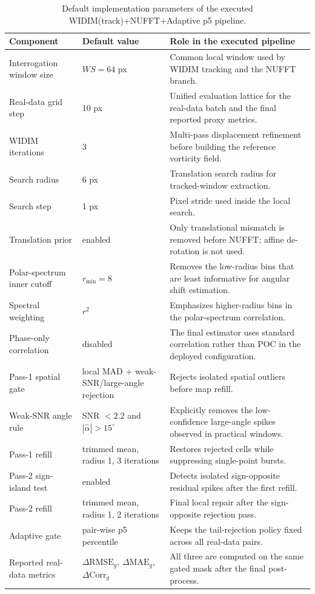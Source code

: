\documentclass[lettersize,journal,onecolumn]{IEEEtran}
\begin{document}
\begin{table}[!t]
  \centering
  \caption{Default implementation parameters of the executed WIDIM(track)+NUFFT+Adaptive p5 pipeline.}
  \label{tab:app_params}
  \small
  \renewcommand{\arraystretch}{1.12}
  \setlength{\tabcolsep}{4pt}
  \begin{tabular}{@{}p{3.3cm}p{2.1cm}p{7.6cm}@{}}
    \toprule
    Component & Default value & Role in the executed pipeline \\
    \midrule
    Interrogation window size & $WS=64$ px & Common local window used by WIDIM tracking and the NUFFT branch. \\
    Real-data grid step & 10 px & Unified evaluation lattice for the real-data batch and the final reported proxy metrics. \\
    WIDIM iterations & 3 & Multi-pass displacement refinement before building the reference vorticity field. \\
    Search radius & 6 px & Translation search radius for tracked-window extraction. \\
    Search step & 1 px & Pixel stride used inside the local search. \\
    Translation prior & enabled & Only translational mismatch is removed before NUFFT; affine de-rotation is not used. \\
    Polar-spectrum inner cutoff & $r_{\min}=8$ & Removes the low-radius bins that are least informative for angular shift estimation. \\
    Spectral weighting & $r^2$ & Emphasizes higher-radius bins in the polar-spectrum correlation. \\
    Phase-only correlation & disabled & The final estimator uses standard correlation rather than POC in the deployed configuration. \\
    Pass-1 spatial gate & local MAD + weak-SNR/large-angle rejection & Rejects isolated spatial outliers before map refill. \\
    Weak-SNR angle rule & SNR $<2.2$ and $|\hat{\alpha}|>15^\circ$ & Explicitly removes the low-confidence large-angle spikes observed in practical windows. \\
    Pass-1 refill & trimmed mean, radius 1, 3 iterations & Restores rejected cells while suppressing single-point bursts. \\
    Pass-2 sign-island test & enabled & Detects isolated sign-opposite residual spikes after the first refill. \\
    Pass-2 refill & trimmed mean, radius 1, 2 iterations & Final local repair after the sign-opposite rejection pass. \\
    Adaptive gate & pair-wise p5 percentile & Keeps the tail-rejection policy fixed across all real-data pairs. \\
    Reported real-data metrics & $\Delta \mathrm{RMSE}_g$, $\Delta \mathrm{MAE}_g$, $\Delta \mathrm{Corr}_g$ & All three are computed on the same gated mask after the final post-process. \\
    \bottomrule
  \end{tabular}
\end{table}
\end{document}
